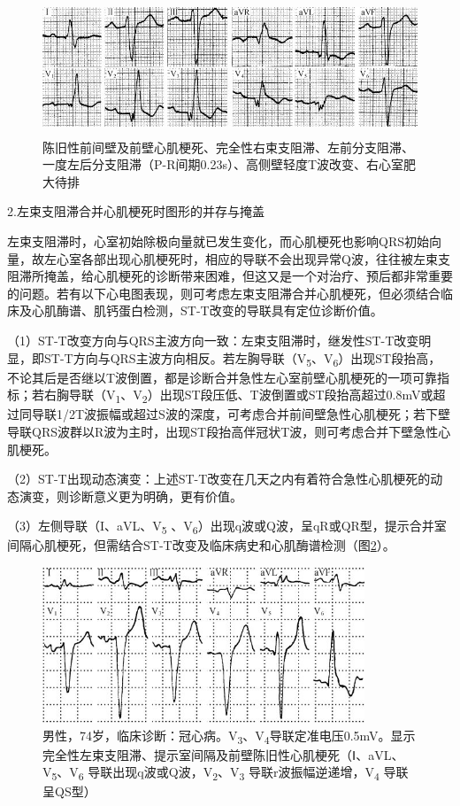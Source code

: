 \begin{figure}[!htbp]
 \centering
 \includegraphics[width=4.98958in,height=1.59375in]{./images/Image00585.jpg}
 \captionsetup{justification=centering}
 \caption{陈旧性前间壁及前壁心肌梗死、完全性右束支阻滞、左前分支阻滞、一度左后分支阻滞（P-R间期0.23s）、高侧壁轻度T波改变、右心室肥大待排}
 \label{fig36-13}
  \end{figure} 

2.左束支阻滞合并心肌梗死时图形的并存与掩盖

左束支阻滞时，心室初始除极向量就已发生变化，而心肌梗死也影响QRS初始向量，故左心室各部出现心肌梗死时，相应的导联不会出现异常Q波，往往被左束支阻滞所掩盖，给心肌梗死的诊断带来困难，但这又是一个对治疗、预后都非常重要的问题。若有以下心电图表现，则可考虑左束支阻滞合并心肌梗死，但必须结合临床及心肌酶谱、肌钙蛋白检测，ST-T改变的导联具有定位诊断价值。

（1）ST-T改变方向与QRS主波方向一致：左束支阻滞时，继发性ST-T改变明显，即ST-T方向与QRS主波方向相反。若左胸导联（V\textsubscript{5}、V\textsubscript{6}）出现ST段抬高，不论其后是否继以T波倒置，都是诊断合并急性左心室前壁心肌梗死的一项可靠指标；若右胸导联（V\textsubscript{1}、V\textsubscript{2}）出现ST段压低、T波倒置或ST段抬高超过0.8mV或超过同导联1/2T波振幅或超过S波的深度，可考虑合并前间壁急性心肌梗死；若下壁导联QRS波群以R波为主时，出现ST段抬高伴冠状T波，则可考虑合并下壁急性心肌梗死。

（2）ST-T出现动态演变：上述ST-T改变在几天之内有着符合急性心肌梗死的动态演变，则诊断意义更为明确，更有价值。

（3）左侧导联（I、aVL、V\textsubscript{5} 、V\textsubscript{6}）出现q波或Q波，呈qR或QR型，提示合并室间隔心肌梗死，但需结合ST-T改变及临床病史和心肌酶谱检测（图\ref{fig36-14}）。

\begin{figure}[!htbp]
 \centering
 \includegraphics[width=3.79167in,height=1.83333in]{./images/Image00586.jpg}
 \captionsetup{justification=centering}
 \caption{男性，74岁，临床诊断：冠心病。V\textsubscript{3}、V\textsubscript{4}导联定准电压0.5mV。显示完全性左束支阻滞、提示室间隔及前壁陈旧性心肌梗死（Ⅰ、aVL、V\textsubscript{5}、V\textsubscript{6} 导联出现q波或Q波，V\textsubscript{2}、V\textsubscript{3} 导联r波振幅逆递增，V\textsubscript{4} 导联呈QS型）
 }
 \label{fig36-14}
  \end{figure} 

